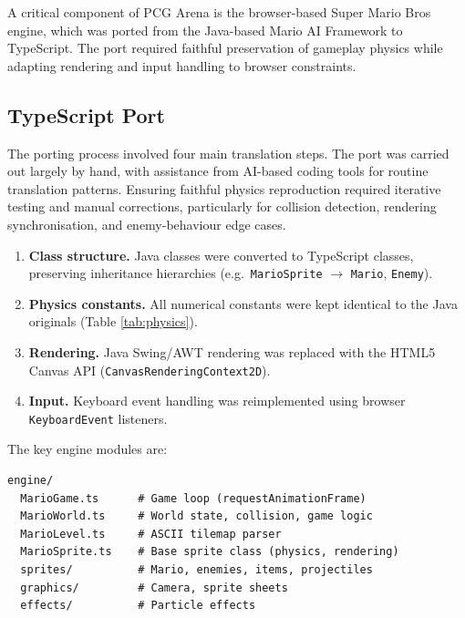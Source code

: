 \documentclass[shortabstract, mgr, english]{iithesis}
\begin{document}
A critical component of PCG Arena is the browser-based Super Mario Bros engine, which was
ported from the Java-based Mario AI Framework \cite{karakovskiy2012marioai} to TypeScript.
The port required faithful preservation of gameplay physics while adapting rendering and
input handling to browser constraints.

\subsection{TypeScript Port}
\label{subsec:sd-ts-port}

The porting process involved four main translation steps. The port was carried
out largely by hand, with assistance from AI-based coding tools for routine
translation patterns.  Ensuring faithful physics reproduction required iterative
testing and manual corrections, particularly for collision detection, rendering
synchronisation, and enemy-behaviour edge cases.

\begin{enumerate}
    \item \textbf{Class structure.} Java classes were converted to TypeScript classes,
          preserving inheritance hierarchies (e.g.\ \texttt{MarioSprite} $\to$
          \texttt{Mario}, \texttt{Enemy}).
    \item \textbf{Physics constants.} All numerical constants were kept identical to the
          Java originals (Table \ref{tab:physics}).
    \item \textbf{Rendering.} Java Swing/AWT rendering was replaced with the HTML5
          Canvas API (\texttt{CanvasRenderingContext2D}).
    \item \textbf{Input.} Keyboard event handling was reimplemented using browser
          \texttt{KeyboardEvent} listeners.
\end{enumerate}

The key engine modules are:

\begin{lstlisting}
engine/
  MarioGame.ts      # Game loop (requestAnimationFrame)
  MarioWorld.ts     # World state, collision, game logic
  MarioLevel.ts     # ASCII tilemap parser
  MarioSprite.ts    # Base sprite class (physics, rendering)
  sprites/          # Mario, enemies, items, projectiles
  graphics/         # Camera, sprite sheets
  effects/          # Particle effects
\end{lstlisting}
\end{document}
